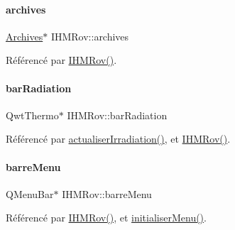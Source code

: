 \mbox{\label{class_i_h_m_rov_a1e64353d7244219599c46450bb84e1df}} 
\paragraph{\texorpdfstring{archives}{archives}}
{\footnotesize\ttfamily \hyperlink{class_archives}{Archives}$\ast$ I\+H\+M\+Rov\+::archives\hspace{0.3cm}{\ttfamily [private]}}



Référencé par \hyperlink{class_i_h_m_rov_a5dac1fb4612866cc61f699a415e0ef6b}{I\+H\+M\+Rov()}.

\mbox{\label{class_i_h_m_rov_a06f0850e46f735c3418360280f6c8336}} 
\paragraph{\texorpdfstring{bar\+Radiation}{barRadiation}}
{\footnotesize\ttfamily Qwt\+Thermo$\ast$ I\+H\+M\+Rov\+::bar\+Radiation\hspace{0.3cm}{\ttfamily [private]}}



Référencé par \hyperlink{class_i_h_m_rov_a9a5108ce8f73fad9a38d02881ec5ae62}{actualiser\+Irradiation()}, et \hyperlink{class_i_h_m_rov_a5dac1fb4612866cc61f699a415e0ef6b}{I\+H\+M\+Rov()}.

\mbox{\label{class_i_h_m_rov_a169e28bc630468d13c05de321f66ca3c}} 
\paragraph{\texorpdfstring{barre\+Menu}{barreMenu}}
{\footnotesize\ttfamily Q\+Menu\+Bar$\ast$ I\+H\+M\+Rov\+::barre\+Menu\hspace{0.3cm}{\ttfamily [private]}}



Référencé par \hyperlink{class_i_h_m_rov_a5dac1fb4612866cc61f699a415e0ef6b}{I\+H\+M\+Rov()}, et \hyperlink{class_i_h_m_rov_aebbcb2325c2d1a88a012d8408e2d6223}{initialiser\+Menu()}.

